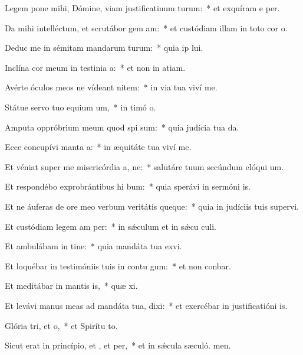 \item Legem pone mihi, Dómine, viam justificatinum turum:~* et exquíram e per.
\item Da mihi intelléctum, et scrutábor gem am:~* et custódiam illam in toto cor o.
\item Deduc me in sémitam mandarum turum:~* quia ip lui.
\item Inclína cor meum in testinia a:~* et non in atiam.
\item Avérte óculos meos ne vídeant nitem:~* in via tua viví me.
\item Státue servo tuo equium um,~* in timó o.
\item Amputa oppróbrium meum quod spi sum:~* quia judícia tua da.
\item Ecce concupívi manta a:~* in æquitáte tua viví me.
\item Et véniat super me misericórdia a, ne:~* salutáre tuum secúndum elóqui um.
\item Et respondébo exprobrántibus hi bum:~* quia sperávi in sermóni is.
\item Et ne áuferas de ore meo verbum veritátis queque:~* quia in judíciis tuis supervi.
\item Et custódiam legem am per:~* in sǽculum et in sǽcu culi.
\item Et ambulábam in tine:~* quia mandáta tua exvi.
\item Et loquébar in testimóniis tuis in contu gum:~* et non conbar.
\item Et meditábar in mantis is,~* quæ xi.
\item Et levávi manus meas ad mandáta tua,  dixi:~* et exercébar in justificatióni is.
\item Glória tri, et o,~* et Spirítu to.
\item Sicut erat in princípio, et , et per,~* et in sǽcula sæculó. men.
